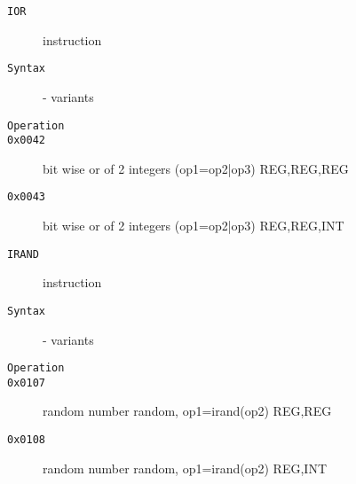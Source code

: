 \begin{description}
\item[\texttt{IOR}] instruction\\
\item[\texttt{Syntax}] - variants\\

\item[\texttt{Operation}]
\item[\texttt{}]
\item[\texttt{0x0042}] bit wise or of 2 integers (op1=op2|op3)  {REG,REG,REG}       \\
\item[\texttt{0x0043}] bit wise or of 2 integers (op1=op2|op3)  {REG,REG,INT}       \\
\end{description}
\clearpage
\begin{description}
\item[\texttt{IRAND}] instruction\\
\item[\texttt{Syntax}] - variants\\

\item[\texttt{Operation}]
\item[\texttt{}]
\item[\texttt{0x0107}] random number random, op1=irand(op2)  {REG,REG}           \\
\item[\texttt{0x0108}] random number random, op1=irand(op2)  {REG,INT}           \\
\end{description}
\clearpage
